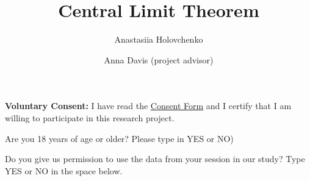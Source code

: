 \documentclass{ximera}
\author{Anastasiia Holovchenko \and Anna Davis (project advisor)} \title{Central Limit Theorem}
\begin{document}
\begin{abstract}
\end{abstract}
\maketitle


\textbf{Voluntary Consent:} I have read the \href{https://ximera.osu.edu/statproj/CLTtoHT/consent/main}{Consent Form} and I certify that I am willing to participate in this research project.

 \begin{question} 
Are you 18 years of age or older? Please type in YES or NO)  
\begin{freeResponse}  
\end{freeResponse}  
\end{question}

\begin{question}  
Do you give us permission to use the data from your session in our study?  Type YES or NO in the space below. 
\begin{freeResponse}  
\end{freeResponse}  
\end{question}
\end{document}
